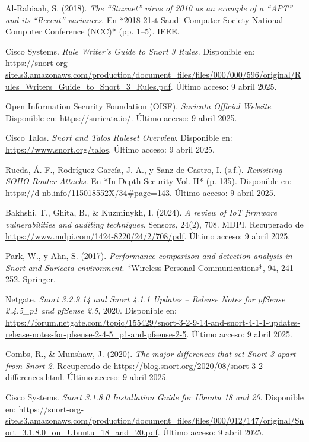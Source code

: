 \documentclass[11pt,a4paper,twoside]{report}
\begin{document}
\begin{thebibliography}{34}
	Al-Rabiaah, S. (2018). \textit{The “Stuxnet” virus of 2010 as an example of a “APT” and its “Recent” variances}. En *2018 21st Saudi Computer Society National Computer Conference (NCC)* (pp. 1--5). IEEE.
	
	Cisco Systems. \textit{Rule Writer’s Guide to Snort 3 Rules}. Disponible en: \url{https://snort-org-site.s3.amazonaws.com/production/document_files/files/000/000/596/original/Rules_Writers_Guide_to_Snort_3_Rules.pdf}. Último acceso: 9 abril 2025.
	
	Open Information Security Foundation (OISF). \textit{Suricata Official Website}. Disponible en: \url{https://suricata.io/}. Último acceso: 9 abril 2025.
	
	Cisco Talos. \textit{Snort and Talos Ruleset Overview}. Disponible en: \url{https://www.snort.org/talos}. Último acceso: 9 abril 2025.
	
	Rueda, Á. F., Rodríguez García, J. A., y Sanz de Castro, I. (s.f.). \textit{Revisiting SOHO Router Attacks}. En *In Depth Security Vol. II* (p. 135). Disponible en: \url{https://d-nb.info/115018552X/34#page=143}. Último acceso: 9 abril 2025.
	
	Bakhshi, T., Ghita, B., \& Kuzminykh, I. (2024). \textit{A review of IoT firmware vulnerabilities and auditing techniques}. Sensors, 24(2), 708. MDPI. Recuperado de \url{https://www.mdpi.com/1424-8220/24/2/708/pdf}. Último acceso: 9 abril 2025.
	
	Park, W., y Ahn, S. (2017). \textit{Performance comparison and detection analysis in Snort and Suricata environment}. *Wireless Personal Communications*, 94, 241--252. Springer.
	
	Netgate. \textit{Snort 3.2.9.14 and Snort 4.1.1 Updates – Release Notes for pfSense 2.4.5\_p1 and pfSense 2.5}, 2020. Disponible en: \url{https://forum.netgate.com/topic/155429/snort-3-2-9-14-and-snort-4-1-1-updates-release-notes-for-pfsense-2-4-5_p1-and-pfsense-2-5}. Último acceso: 9 abril 2025.	
	
	Combs, R., \& Munshaw, J. (2020). \textit{The major differences that set Snort 3 apart from Snort 2}. Recuperado de \url{https://blog.snort.org/2020/08/snort-3-2-differences.html}. Último acceso: 9 abril 2025.
	
	Cisco Systems. \textit{Snort 3.1.8.0 Installation Guide for Ubuntu 18 and 20}. Disponible en: \url{https://snort-org-site.s3.amazonaws.com/production/document_files/files/000/012/147/original/Snort_3.1.8.0_on_Ubuntu_18_and_20.pdf}. Último acceso: 9 abril 2025.
	

\end{thebibliography}
\end{document}
